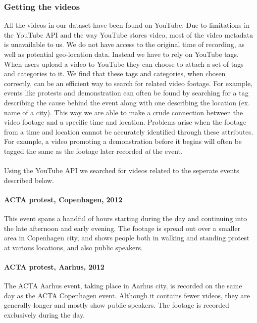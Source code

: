 \subsubsection{Getting the videos}
%
All the videos in our dataset have been found on YouTube. Due to limitations in the YouTube API and the way YouTube stores video, most of the video metadata is unavailable to us. We do not have access to the original time of recording, as well as potential geo-location data. Instead we have to rely on YouTube tags. When users upload a video to YouTube they can choose to attach a set of tags and categories to it. We find that these tags and categories, when chosen correctly, can be an efficient way to search for related video footage. For example, events like protests and demonstration can often be found by searching for a tag describing the cause behind the event along with one describing the location (ex. name of a city). This way we are able to make a crude connection between the video footage and a specific time and location. Problems arise when the footage from a time and location cannot be accurately identified through these attributes. For example, a video promoting a demonstration before it begins will often be tagged the same as the footage later recorded \emph{at} the event.\\\\ %
%
Using the YouTube API we searched for videos related to the seperate events described below.
%
\paragraph{ACTA protest, Copenhagen, 2012}
%
This event spans a handful of hours starting during the day and continuing into the late afternoon and early evening. The footage is spread out over a smaller area in Copenhagen city, and shows people both in walking and standing protest at various locations, and also public speakers.
%
\paragraph{ACTA protest, Aarhus, 2012}
%
The ACTA Aarhus event, taking place in Aarhus city, is recorded on the same day as the ACTA Copenhagen event. Although it contains fewer videos, they are generally longer and mostly show public speakers. The footage is recorded exclusively during the day.
%
